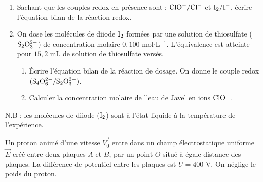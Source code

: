 \documentclass[11pt]{article}
\begin{document}
\begin{enumerate}
  \item Sachant que les couples redox en présence sont : $\mathrm{ClO^-/Cl^-}$ et $\mathrm{I_2/I^-}$, écrire l'équation bilan de la réaction redox.
  \item On dose les molécules de diiode $\mathrm{I_2}$ formées par une solution de thiosulfate ($\mathrm{S_2O_3^{2-}}$) de concentration molaire $0{,}100$ mol$\cdot$L$^{-1}$. L'équivalence est atteinte pour $15{,}2$ mL de solution de thiosulfate versés.
  \begin{enumerate}[label=\alph*.]
    \item Écrire l'équation bilan de la réaction de dosage. On donne le couple redox $(\mathrm{S_4O_6^{2-}/S_2O_3^{2-}})$.
    \item Calculer la concentration molaire de l'eau de Javel en ions $\mathrm{ClO^-}$.
  \end{enumerate}
\end{enumerate}
\noindent N.B : les molécules de diiode ($\mathrm{I_2}$) sont à l'état liquide à la température de l'expérience.


Un proton animé d'une vitesse $\vec{V_0}$ entre dans un champ électrostatique uniforme $\vec{E}$ créé entre deux plaques $A$ et $B$, par un point $O$ situé à égale distance des plaques. La différence de potentiel entre les plaques est $U = 400$ V. On néglige le poids du proton.

\begin{center}
\end{center}
\end{document}
